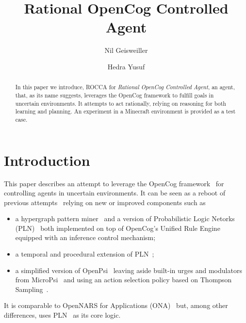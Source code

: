 \documentclass[runningheads]{llncs}
\begin{document}
%
\title{Rational OpenCog Controlled Agent}

%
\author{Nil Geisweiller
  \and Hedra Yusuf}
%
%
%
\maketitle              %
%

\begin{abstract}
  In this paper we introduce, ROCCA for \emph{Rational OpenCog
    Controlled Agent}, an agent, that, as its name suggests, leverages
  the OpenCog framework to fulfill goals in uncertain environments.
  It attempts to act rationally, relying on reasoning for both
  learning and planning.  An experiment in a Minecraft environment is
  provided as a test case.

\end{abstract}

\section{Introduction}
This paper describes an attempt to leverage the OpenCog
framework~\cite{Hart2008} for controlling agents in uncertain
environments.  It can be seen as a reboot of previous
attempts~\cite{Goertzel2008, Goertzel2011CSP, Cai2013}
relying on new or improved components such as
\begin{itemize}
\item a hypergraph pattern miner~\cite{Geisweiller2019} and a version
  of Probabilistic Logic Netorks (PLN)~\cite{Goertzel2009} both
  implemented on top of OpenCog's Unified Rule Engine equipped with an
  inference control mechanism;
\item a temporal and procedural extension of
  PLN~\cite{Geisweiller2023PLNTP};
\item a simplified version of OpenPsi~\cite{Cai2013} leaving
  aside built-in urges and modulators from MicroPsi~\cite{Bach2012}
  and using an action selection policy based on Thompson
  Sampling~\cite{Leike2016}.
\end{itemize}
It is comparable to OpenNARS for Applications (ONA)~\cite{Hammer2020}
but, among other differences, uses PLN~\cite{Goertzel2009} as its core
logic.
\end{document}
